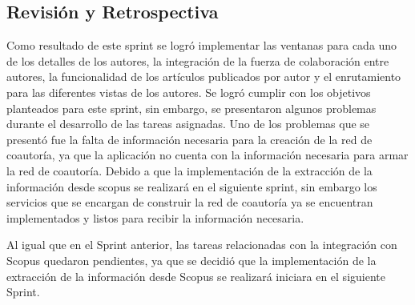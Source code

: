 \subsection{Revisión y Retrospectiva}
Como resultado de este sprint se logró implementar las ventanas para cada uno de los detalles de los autores, la integración de la fuerza de colaboración entre autores, la funcionalidad de los artículos publicados por autor y el enrutamiento para las diferentes vistas de los autores.
Se logró cumplir con los objetivos planteados para este sprint, sin embargo, se presentaron algunos problemas durante el desarrollo de las tareas asignadas.
Uno de los problemas que se presentó fue la falta de información necesaria para la creación de la red de coautoría, ya que la aplicación no cuenta con la información necesaria para armar la red de coautoría.
Debido a que la implementación de la extracción de la información desde scopus se realizará en el siguiente sprint, sin embargo los servicios que se encargan de construir la red de coautoría ya se encuentran implementados y listos para recibir la información necesaria.

Al igual que en el Sprint anterior, las tareas relacionadas con la integración con Scopus quedaron pendientes, ya que se decidió que la implementación de la extracción de la información desde Scopus se realizará iniciara en el siguiente Sprint.